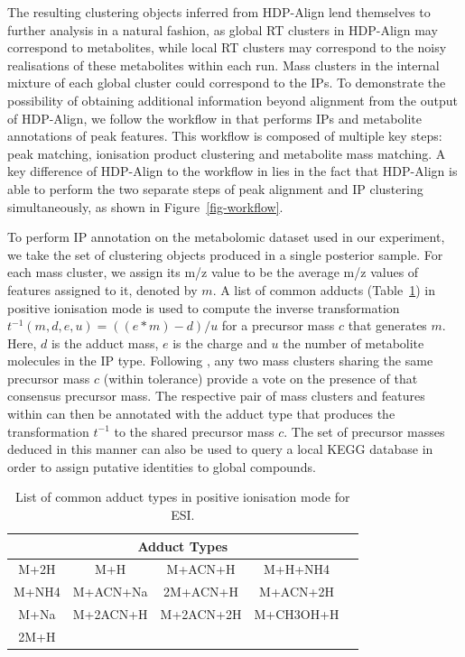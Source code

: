 The resulting clustering objects inferred from HDP-Align lend themselves to further analysis in a natural fashion, as global RT clusters in HDP-Align may correspond to metabolites, while local RT clusters may correspond to the noisy realisations of these metabolites within each run. Mass clusters in the internal mixture of each global cluster could correspond to the IPs. To demonstrate the possibility of obtaining additional information beyond alignment from the output of HDP-Align, we follow the workflow in \cite{Lee2013} that performs IPs and metabolite annotations of peak features. This workflow is composed of multiple key steps: peak matching, ionisation product clustering and metabolite mass matching. A key difference of HDP-Align to the workflow in \cite{Lee2013} lies in the fact that HDP-Align is able to perform the two separate steps of peak alignment and IP clustering simultaneously, as shown in Figure~\ref{fig-workflow}. 

To perform IP annotation on the metabolomic dataset used in our experiment, we take the set of clustering objects produced in a single posterior sample. For each mass cluster, we assign its m/z value to be the average m/z values of features assigned to it, denoted by $m$. A list of common adducts (Table~\ref{tab:adducts}) in positive ionisation mode is used to compute the inverse transformation $t^{-1}(m,d,e,u) = ((e*m)-d)/u$ for a precursor mass $c$ that generates $m$. Here, $d$ is the adduct mass, $e$ is the charge and $u$ the number of metabolite molecules in the IP type. Following \cite{Lee2013}, any two mass clusters sharing the same precursor mass $c$ (within tolerance) provide a vote on the presence of that consensus precursor mass. The respective pair of mass clusters and features within can then be annotated with the adduct type that produces the transformation $t^{-1}$ to the shared precursor mass $c$. The set of precursor masses deduced in this manner can also be used to query a local KEGG database in order to assign putative identities to global compounds.


\begin{table}
\begin{centering}
\protect\caption{List of common adduct types in positive ionisation mode for ESI.\label{tab:adducts}}
\begin{tabular}{|ccccc|}
\hline 
\multicolumn{5}{|c|}{{\footnotesize{}Adduct Types}}\tabularnewline
\hline 
\hline 
{\footnotesize{}M+2H} & {\footnotesize{}M+H} & {\footnotesize{}M+ACN+H} & {\footnotesize{}M+H+NH4} & \tabularnewline
{\footnotesize{}M+NH4} & {\footnotesize{}M+ACN+Na} & {\footnotesize{}2M+ACN+H} & {\footnotesize{}M+ACN+2H} & \tabularnewline
{\footnotesize{}M+Na} & {\footnotesize{}M+2ACN+H} & {\footnotesize{}M+2ACN+2H} & {\footnotesize{}M+CH3OH+H} & \tabularnewline
{\footnotesize{}2M+H} &  &  &  & \tabularnewline
\hline 
\end{tabular}
\par\end{centering}
\end{table}

